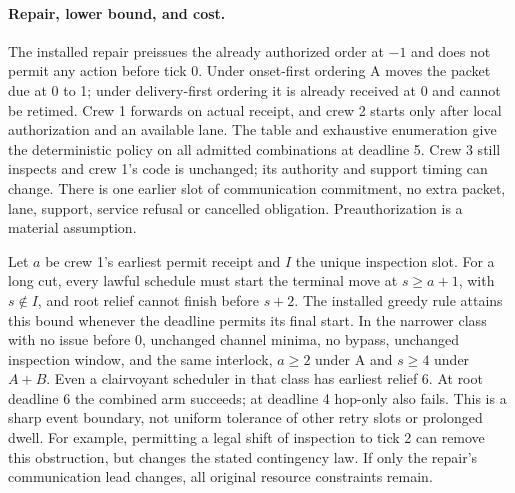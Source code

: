 \documentclass[11pt]{article}
\begin{document}
\paragraph{Repair, lower bound, and cost.}
The installed repair preissues the already authorized order at $-1$ and does not permit any action before tick 0. Under onset-first ordering A moves the packet due at 0 to 1; under delivery-first ordering it is already received at 0 and cannot be retimed. Crew 1 forwards on actual receipt, and crew 2 starts only after local authorization and an available lane. The table and exhaustive enumeration give the deterministic policy on all admitted combinations at deadline 5. Crew 3 still inspects and crew 1's code is unchanged; its authority and support timing can change. There is one earlier slot of communication commitment, no extra packet, lane, support, service refusal or cancelled obligation. Preauthorization is a material assumption.

Let $a$ be crew 1's earliest permit receipt and $I$ the unique inspection slot. For a long cut, every lawful schedule must start the terminal move at $s\ge a+1$, with $s\notin I$, and root relief cannot finish before $s+2$. The installed greedy rule attains this bound whenever the deadline permits its final start. In the narrower class with no issue before 0, unchanged channel minima, no bypass, unchanged inspection window, and the same interlock, $a\ge2$ under A and $s\ge4$ under $A+B$. Even a clairvoyant scheduler in that class has earliest relief 6. At root deadline 6 the combined arm succeeds; at deadline 4 hop-only also fails. This is a sharp event boundary, not uniform tolerance of other retry slots or prolonged dwell. For example, permitting a legal shift of inspection to tick 2 can remove this obstruction, but changes the stated contingency law. If only the repair's communication lead changes, all original resource constraints remain.
\end{document}
